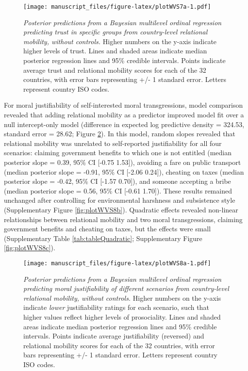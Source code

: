 \documentclass[
  man,floatsintext]{apa6}
\begin{document}
\begin{figure}
\centering
\texttt{[image: manuscript\_files/figure-latex/plotWVS7a-1.pdf]}
\caption{\label{fig:plotWVS7a}\emph{Posterior predictions from a Bayesian multilevel ordinal regression predicting trust in specific groups from country-level relational mobility, without controls.} Higher numbers on the y-axis indicate higher levels of trust. Lines and shaded areas indicate median posterior regression lines and 95\% credible intervals. Points indicate average trust and relational mobility scores for each of the 32 countries, with error bars representing +/- 1 standard error. Letters represent country ISO codes.}
\end{figure}

For moral justifiability of self-interested moral transgressions, model comparison revealed that adding relational mobility as a predictor improved model fit over a null intercept-only model (difference in expected log predictive density = 324.53, standard error = 28.62; Figure \ref{fig:plotWVS8a}). In this model, random slopes revealed that relational mobility was unrelated to self-reported justifiability for all four scenarios: claiming government benefits to which one is not entitled (median posterior slope = 0.39, 95\% CI {[}-0.75 1.53{]}), avoiding a fare on public transport (median posterior slope = -0.91, 95\% CI {[}-2.06 0.24{]}), cheating on taxes (median posterior slope = -0.42, 95\% CI {[}-1.57 0.70{]}), and someone accepting a bribe (median posterior slope = 0.56, 95\% CI {[}-0.61 1.70{]}). These results remained unchanged after controlling for environmental harshness and subsistence style (Supplementary Figure \ref{fig:plotWVS8b}). Quadratic effects revealed non-linear relationships between relational mobility and two moral transgressions, claiming government benefits and cheating on taxes, but the effects were small (Supplementary Table \ref{tab:tableQuadratic}; Supplementary Figure \ref{fig:plotWVS8c}).



\begin{figure}
\centering
\texttt{[image: manuscript\_files/figure-latex/plotWVS8a-1.pdf]}
\caption{\label{fig:plotWVS8a}\emph{Posterior predictions from a Bayesian multilevel ordinal regression predicting moral justifiability of different scenarios from country-level relational mobility, without controls.} Higher numbers on the y-axis indicate \emph{lower} justifiability ratings for each scenario, such that higher values reflect higher levels of prosociality. Lines and shaded areas indicate median posterior regression lines and 95\% credible intervals. Points indicate average justifiability (reversed) and relational mobility scores for each of the 32 countries, with error bars representing +/- 1 standard error. Letters represent country ISO codes.}
\end{figure}
\end{document}

